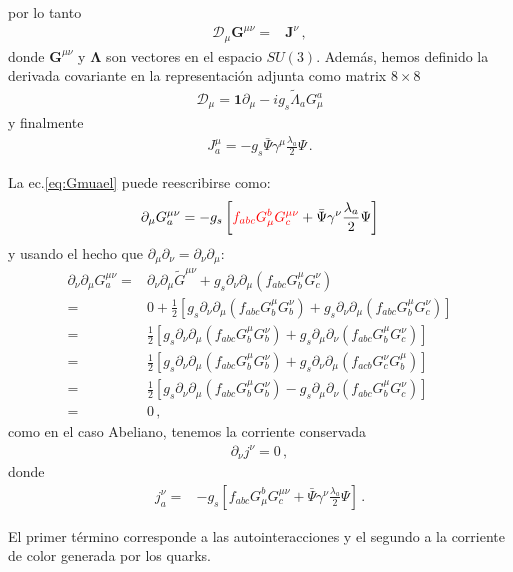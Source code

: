 \begin{frame}
por lo tanto
\begin{align}
  \mathcal{D}_\mu{\boldsymbol{G}}^{\mu\nu}
=&\boldsymbol{J}^{\nu}\,,
\end{align}
donde $\boldsymbol{G}^{\mu\nu}$ y $\boldsymbol{\Lambda}$ son vectores en el espacio $SU(3)$.
Además, hemos definido la derivada covariante en la representación adjunta como matrix  $8\times8$ 
\begin{align}
  \mathcal{D}_{\mu}=\mathbf{1}\partial_{\mu}-i g_s \widetilde{\Lambda}_a G_{\mu}^{a} 
\end{align}
y finalmente
\begin{align}
J^\mu_a = -g_s\bar{\Psi}\gamma^\mu\frac{\lambda_a}{2}\Psi\,.
\end{align}

La ec.\eqref{eq:Gmuael} puede reescribirse como:
\begin{align}
  \partial_\mu G^{\mu\nu}_a=-g_s\left[{\color{red}f_{abc}G^b_\mu G^{\mu\nu}_c}+\bar{\Psi}\gamma^\nu\frac{\lambda_a}{2}\Psi  \right]
\end{align}
y usando el hecho que $\partial_\mu\partial_\nu=\partial_\nu\partial_\mu$:
\begin{align}
  \partial_\nu\partial_\mu G^{\mu\nu}_a=&\partial_\nu\partial_\mu\widetilde{G}^{\mu\nu}+g_s\partial_\nu\partial_\mu\left(f_{abc}G^\mu_bG^\nu_c\right)\nonumber\\
=&0+\frac{1}{2}\left[g_s\partial_\nu\partial_\mu\left(f_{abc}G^\mu_bG^\nu_b\right)+g_s\partial_\nu\partial_\mu\left(f_{abc}G^\mu_bG^\nu_c\right)\right]\nonumber\\
=&\frac{1}{2}\left[g_s\partial_\nu\partial_\mu\left(f_{abc}G^\mu_bG^\nu_b\right)+g_s\partial_\mu\partial_\nu\left(f_{abc}G^\mu_bG^\nu_c\right)\right]\nonumber\\
=&\frac{1}{2}\left[g_s\partial_\nu\partial_\mu\left(f_{abc}G^\mu_bG^\nu_b\right)+g_s\partial_\nu\partial_\mu\left(f_{acb}G^\nu_cG^\mu_b\right)\right]\nonumber\\
=&\frac{1}{2}\left[g_s\partial_\nu\partial_\mu\left(f_{abc}G^\mu_bG^\nu_b\right)-g_s\partial_\mu\partial_\nu\left(f_{abc}G^\mu_bG^\nu_c\right)\right]\nonumber\\
=&0\,,
\end{align}
como en el caso Abeliano, tenemos la corriente conservada
\begin{align}
  \partial_\nu j^\nu=0\,,
\end{align}
donde
\begin{align}
\label{eq:jnuqcd}
  j^\nu_a=&-g_s\left[f_{abc}G^b_\mu G^{\mu\nu}_c+\bar{\Psi}\gamma^\nu\frac{\lambda_a}{2}\Psi  \right]\,.
\end{align}

El primer término corresponde a las autointeracciones y el segundo a la corriente de color generada por los quarks.
\end{frame}

